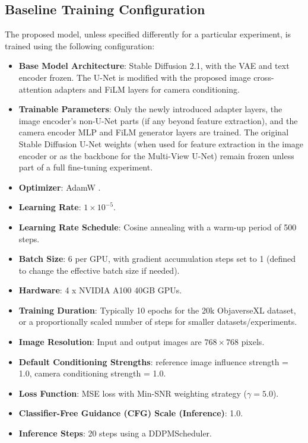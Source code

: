 \subsection{Baseline Training Configuration}\label{ssec:exp_baseline_config}
The proposed model, unless specified differently for a particular experiment, is trained using the following configuration:
\begin{itemize}
  \item \textbf{Base Model Architecture}: Stable Diffusion 2.1, with the VAE and text encoder frozen. The U-Net is modified with the proposed image cross-attention adapters and FiLM layers for camera conditioning.
  \item \textbf{Trainable Parameters}: Only the newly introduced adapter layers, the image encoder's non-U-Net parts (if any beyond feature extraction), and the camera encoder MLP and FiLM generator layers are trained. The original Stable Diffusion U-Net weights (when used for feature extraction in the image encoder or as the backbone for the Multi-View U-Net) remain frozen unless part of a full fine-tuning experiment.
  \item \textbf{Optimizer}: AdamW \cite{adamw}.
  \item \textbf{Learning Rate}: $1 \times 10^{-5}$.
  \item \textbf{Learning Rate Schedule}: Cosine annealing with a warm-up period of 500 steps.
  \item \textbf{Batch Size}: 6 per GPU, with gradient accumulation steps set to 1 (defined to change the effective batch size if needed).
  \item \textbf{Hardware}: 4 x NVIDIA A100 40GB GPUs.
  \item \textbf{Training Duration}: Typically 10 epochs for the 20k ObjaverseXL dataset, or a proportionally scaled number of steps for smaller datasets/experiments.
  \item \textbf{Image Resolution}: Input and output images are $768 \times 768$ pixels.
  \item \textbf{Default Conditioning Strengths}: reference image influence strength = 1.0, camera conditioning strength = 1.0.
  \item \textbf{Loss Function}: MSE loss with Min-SNR weighting strategy ($\gamma=5.0$).
  \item \textbf{Classifier-Free Guidance (CFG) Scale (Inference)}: 1.0.
  \item \textbf{Inference Steps}: 20 steps using a DDPMScheduler.
\end{itemize}


